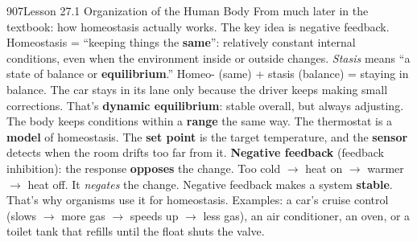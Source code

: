 \documentclass[11pt,letterpaper]{article}
\begin{document}
\begin{tbpage}{907}{Lesson 27.1 Organization of the Human Body}
  {From much later in the textbook: how homeostasis actually works. The key idea is negative feedback.}
    {Homeostasis = ``keeping things the \textbf{same}'': relatively constant internal conditions, even when the environment inside or outside changes.}
    {\emph{Stasis} means ``a state of balance or \textbf{equilibrium}.'' Homeo- (same) + stasis (balance) = staying in balance.}
    {The car stays in its lane only because the driver keeps making small corrections. That's \textbf{dynamic equilibrium}: stable overall, but always adjusting. The body keeps conditions within a \textbf{range} the same way.}
    {The thermostat is a \textbf{model} of homeostasis. The \textbf{set point} is the target temperature, and the \textbf{sensor} detects when the room drifts too far from it.}
    {\textbf{Negative feedback} (feedback inhibition): the response \textbf{opposes} the change. Too cold $\rightarrow$ heat on $\rightarrow$ warmer $\rightarrow$ heat off. It \emph{negates} the change.}
    {Negative feedback makes a system \textbf{stable}. That's why organisms use it for homeostasis.}
    {Examples: a car's cruise control (slows $\rightarrow$ more gas $\rightarrow$ speeds up $\rightarrow$ less gas), an air conditioner, an oven, or a toilet tank that refills until the float shuts the valve.}
\end{tbpage}
\end{document}
